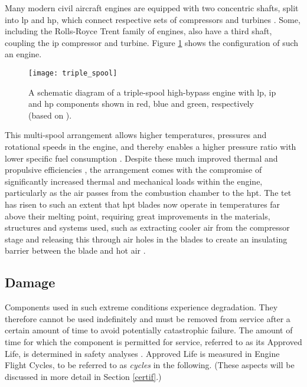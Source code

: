 Many modern civil aircraft engines are equipped with two concentric shafts, split into \ac{lp} and \ac{hp}, which connect respective sets of compressors and turbines \cite[]{spittle_gas_2003}. Some, including the Rolls-Royce Trent family of engines, also have a third shaft, coupling the \ac{ip} compressor and turbine. Figure \ref{fig:triple_spool} shows the configuration of such an engine.

\begin{figure}
    \centering
    \texttt{[image: triple\_spool]}
    \caption{\label{fig:triple_spool} A schematic diagram of a triple-spool high-bypass engine with \ac{lp}, \ac{ip} and \ac{hp} components shown in red, blue and green, respectively (based on \protect\cite[]{rolls-royce_plc_jet_2015}).}
\end{figure}

This multi-spool arrangement allows higher temperatures, pressures and rotational speeds in the engine, and thereby enables a higher pressure ratio with lower specific fuel consumption \cite[p. ~20]{rolls-royce_plc_jet_2015}. Despite these much improved thermal and propulsive efficiencies \cite[p. ~225]{rolls-royce_plc_jet_2015}, the arrangement comes with the compromise of significantly increased thermal and mechanical loads within the engine, particularly as the air passes from the combustion chamber to the \ac{hpt}. The \ac{tet} has risen to such an extent that \ac{hpt} blades now operate in temperatures far above their melting point, requiring great improvements in the materials, structures and systems used, such as extracting cooler air from the compressor stage and releasing this through air holes in the blades to create an insulating barrier between the blade and hot air \cite[]{spittle_gas_2003}.

\subsection{Damage}
Components used in such extreme conditions experience degradation. They therefore cannot be used indefinitely and must be removed from service after a certain amount of time to avoid potentially catastrophic failure. The amount of time for which the component is permitted for service, referred to as its Approved Life, is determined in safety analyses \cite[]{easa_certification_2015}. Approved Life is measured in Engine Flight Cycles, to be referred to as \textit{cycles} in the following. (These aspects will be discussed in more detail in Section \ref{certif}.)

